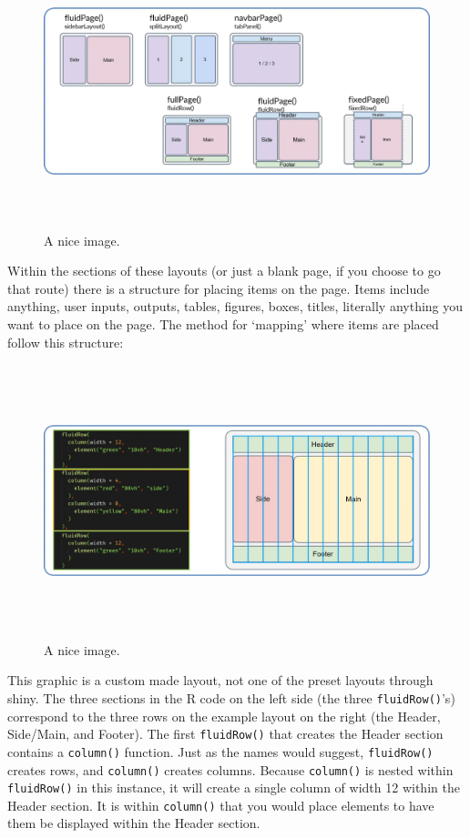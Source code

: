 \documentclass[
]{article}
\begin{document}
\begin{figure}
\includegraphics[width=700px,height=300]{figures/shiny-layouts} \caption{A nice image.}\label{fig:unnamed-chunk-1}
\end{figure}

\hfill\break

Within the sections of these layouts (or just a blank page, if you
choose to go that route) there is a structure for placing items on the
page. Items include anything, user inputs, outputs, tables, figures,
boxes, titles, literally anything you want to place on the page. The
method for `mapping' where items are placed follow this structure:\\

\begin{figure}
\includegraphics[width=700px,height=300]{figures/bootstrap-layout} \caption{A nice image.}\label{fig:unnamed-chunk-2}
\end{figure}

This graphic is a custom made layout, not one of the preset layouts
through shiny. The three sections in the R code on the left side (the
three \texttt{fluidRow()}'s) correspond to the three rows on the example
layout on the right (the Header, Side/Main, and Footer). The first
\texttt{fluidRow()} that creates the Header section contains a
\texttt{column()} function. Just as the names would suggest,
\texttt{fluidRow()} creates rows, and \texttt{column()} creates columns.
Because \texttt{column()} is nested within \texttt{fluidRow()} in this
instance, it will create a single column of width 12 within the Header
section. It is within \texttt{column()} that you would place elements to
have them be displayed within the Header section.
\end{document}
